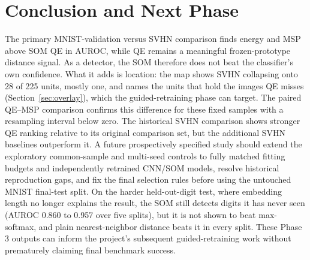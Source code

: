 \documentclass[11pt]{article}
\begin{document}
\section{Conclusion and Next Phase}
The primary MNIST-validation versus SVHN comparison finds energy and MSP above SOM QE in AUROC, while QE remains a meaningful frozen-prototype distance signal. As a detector, the SOM therefore does not beat the classifier's own confidence. What it adds is location: the map shows SVHN collapsing onto 28 of 225 units, mostly one, and names the units that hold the images QE misses (Section~\ref{sec:overlay}), which the guided-retraining phase can target. The paired QE--MSP comparison confirms this difference for these fixed samples with a resampling interval below zero. The historical SVHN comparison shows stronger QE ranking relative to its original comparison set, but the additional SVHN baselines outperform it. A future prospectively specified study should extend the exploratory common-sample and multi-seed controls to fully matched fitting budgets and independently retrained CNN/SOM models, resolve historical reproduction gaps, and fix the final selection rules before using the untouched MNIST final-test split. On the harder held-out-digit test, where embedding length no longer explains the result, the SOM still detects digits it has never seen (AUROC 0.860 to 0.957 over five splits), but it is not shown to beat max-softmax, and plain nearest-neighbor distance beats it in every split. These Phase 3 outputs can inform the project's subsequent guided-retraining work without prematurely claiming final benchmark success.

\printbibliography[title={References}]
\end{document}

